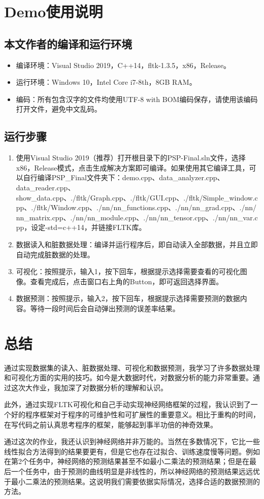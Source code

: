 \documentclass[CJK]{ctexart}
\begin{document}
\section{Demo使用说明}
\subsection{本文作者的编译和运行环境}
\begin{itemize}
    \item 编译环境：Visual Studio 2019，C++14，fltk-1.3.5，x86，Release。
    \item 运行环境：Windows 10，Intel Core i7-8th，8GB RAM。
    \item 编码：所有包含汉字的文件均使用UTF-8 with BOM编码保存，请使用该编码打开文件，避免中文乱码。
\end{itemize}
\subsection{运行步骤}
\begin{enumerate}
    \item 使用Visual Studio 2019（推荐）打开根目录下的PSP-Final.sln文件，选择x86，Release模式，点击生成解决方案即可编译。如果使用其它编译工具，可以自行编译PSP\_Final文件夹下：demo.cpp、data\_analyzer.cpp、data\_reader.cpp、show\_data.cpp、./fltk/Graph.cpp、./fltk/GUI.cpp、./fltk/Simple\_window.cpp、./fltk/Window.cpp、./nn/nn\_functions.cpp、./nn/nn\_grad.cpp、./nn/nn\_matrix.cpp、./nn/nn\_module.cpp、./nn/nn\_tensor.cpp、./nn/nn\_var.cpp，设定-std=c++14，并链接FLTK库。
    \item 数据读入和脏数据处理：编译并运行程序后，即自动读入全部数据，并且立即自动完成脏数据的处理。
    \item 可视化：按照提示，输入1，按下回车，根据提示选择需要查看的可视化图像。查看完成后，点击窗口右上角的Button，即可返回选择界面。
    \item 数据预测：按照提示，输入2，按下回车，根据提示选择需要预测的数据内容。等待一段时间后会自动弹出预测的误差率结果。
\end{enumerate}


\section{总结}
通过实现数据集的读入、脏数据处理、可视化和数据预测，我学习了许多数据处理和可视化方面的实用的技巧。如今是大数据时代，对数据分析的能力非常重要。通过这次大作业，我加深了对数据分析的理解和认识。\par
此外，通过实现FLTK可视化和自己手动实现神经网络框架的过程，我认识到了一个好的程序框架对于程序的可维护性和可扩展性的重要意义。相比于重构的时间，在写代码之前认真思考程序的框架，能够起到事半功倍的神奇效果。\par
通过这次的作业，我还认识到神经网络并非万能的。当然在多数情况下，它比一些线性拟合方法得到的结果要更有，但是它也存在过拟合、训练速度慢等问题。例如在第2个任务中，神经网络的预测结果甚至不如最小二乘法的预测结果；但是在最后一个任务中，由于预测的曲线明显是非线性的，所以神经网络的预测结果远远优于最小二乘法的预测结果。这说明我们需要依据实际情况，选择合适的数据预测的方法。
\end{document}
